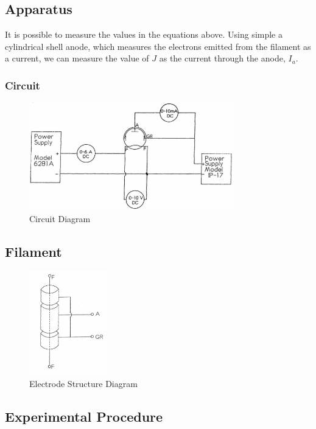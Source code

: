 \subsection{Apparatus}
It is possible to measure the values in the equations above. Using simple a cylindrical shell anode, which measures the electrons emitted from the filament as a current, we can measure the value of $J$ as the current through the anode, $I_a$. \\




\subsubsection{Circuit}
\label{sec:e1}
\begin{figure}[H]
\centering
\includegraphics[width=0.8\textwidth]{figures/CircuitDiagram.png}
\caption{Circuit Diagram}
\label{Circuit}
\end{figure}

\subsection{Filament}
\begin{figure}[H]
\centering
\includegraphics[width=0.3\textwidth]{figures/ElectrodeStructure.png}
\caption{Electrode Structure Diagram}
\end{figure}

\subsection{Experimental Procedure}

